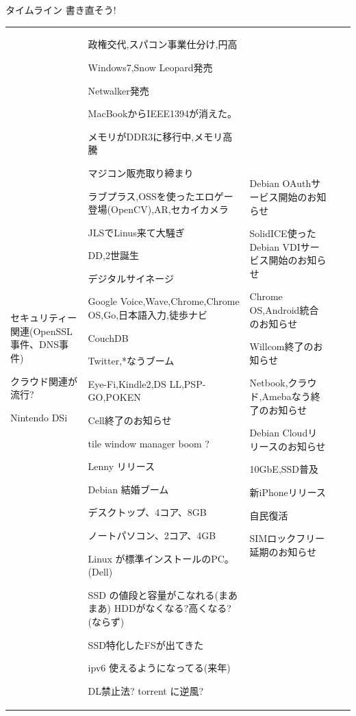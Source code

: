\begin{frame}{タイムライン 書き直そう!}
{\begin{tabular}[t]{|p{4em}|p{4em}|p{9em}|p{7em}|p{6em}|}
セキュリティー関連(OpenSSL 事件、DNS事件)

クラウド関連が流行?

Nintendo DSi

&
政権交代,スパコン事業仕分け,円高

Windows7,Snow Leopard発売

Netwalker発売

MacBookからIEEE1394が消えた。

メモリがDDR3に移行中,メモリ高騰

マジコン販売取り締まり

ラブプラス,OSSを使ったエロゲー登場(OpenCV),AR,セカイカメラ

JLSでLinus来て大騒ぎ

DD,2世誕生

デジタルサイネージ

Google Voice,Wave,Chrome,Chrome OS,Go,日本語入力,徒歩ナビ

CouchDB

Twitter,*なうブーム

Eye-Fi,Kindle2,DS LL,PSP-GO,POKEN

Cell終了のお知らせ

tile window manager boom ?

Lenny リリース

Debian 結婚ブーム

デスクトップ、4コア、8GB

ノートパソコン、2コア、4GB

Linux が標準インストールのPC。(Dell)

SSD の値段と容量がこなれる(まあまあ)
HDDがなくなる?高くなる?(ならず)

SSD特化したFSが出てきた

ipv6 使えるようになってる(来年)

DL禁止法? torrent に逆風?

&
Debian OAuthサービス開始のお知らせ

SolidICE使ったDebian VDIサービス開始のお知らせ

Chrome OS,Android統合のお知らせ

Willcom終了のお知らせ

Netbook,クラウド,Amebaなう終了のお知らせ

Debian Cloudリリースのお知らせ

10GbE,SSD普及

新iPhoneリリース

自民復活

SIMロックフリー延期のお知らせ


\end{tabular}}
\end{frame}
